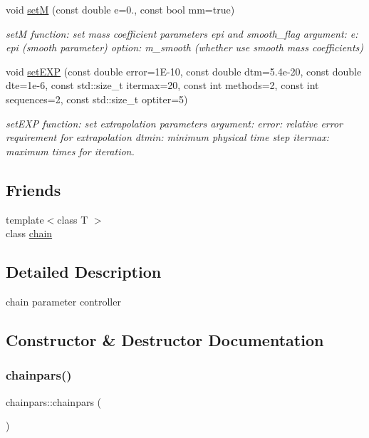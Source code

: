 \begin{DoxyCompactItemize}
void \hyperlink{classchainpars_a1ca68735d5d1a6f0fbf25d4ab9d1e466}{setM} (const double e=0., const bool mm=true)
\begin{DoxyCompactList}\small\item\em setM function\+: set mass coefficient parameters epi and smooth\+\_\+flag argument\+: e\+: epi (smooth parameter) option\+: m\+\_\+smooth (whether use smooth mass coefficients) \end{DoxyCompactList}\item 
void \hyperlink{classchainpars_a04954a52ce40d1efd400ccc694dda2a1}{set\+E\+XP} (const double error=1\+E-\/10, const double dtm=5.\+4e-\/20, const double dte=1e-\/6, const std\+::size\+\_\+t itermax=20, const int methods=2, const int sequences=2, const std\+::size\+\_\+t optiter=5)
\begin{DoxyCompactList}\small\item\em set\+E\+XP function\+: set extrapolation parameters argument\+: error\+: relative error requirement for extrapolation dtmin\+: minimum physical time step itermax\+: maximum times for iteration. \end{DoxyCompactList}\end{DoxyCompactItemize}
\subsection*{Friends}
\begin{DoxyCompactItemize}
\item 
{\footnotesize template$<$class T $>$ }\\class \hyperlink{classchainpars_a498fbb4337b9878a5f0044996e4a2489}{chain}
\end{DoxyCompactItemize}


\subsection{Detailed Description}
chain parameter controller 

\subsection{Constructor \& Destructor Documentation}
\hypertarget{classchainpars_a9836082e4bce43f405a5d16a2bcc6f98}{}\label{classchainpars_a9836082e4bce43f405a5d16a2bcc6f98} 
\subsubsection{\texorpdfstring{chainpars()}{chainpars()}\hspace{0.1cm}{\footnotesize\ttfamily [1/2]}}
{\footnotesize\ttfamily chainpars\+::chainpars (\begin{DoxyParamCaption}{ }\end{DoxyParamCaption})\hspace{0.3cm}{\ttfamily [inline]}}



